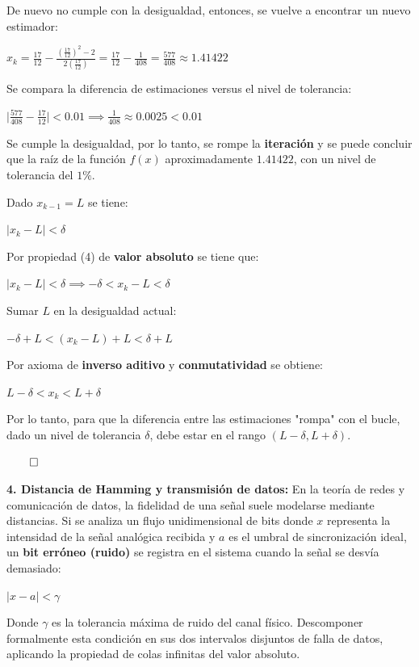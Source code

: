 \documentclass{article}
\newenvironment{nota_computacional}
  {\begin{mdframed}[backgroundcolor=gray!10, linecolor=gray!40, roundcorner=5pt, skipabove=10pt, skipbelow=10pt]}
  {\end{mdframed}}
\begin{document}
\begin{nota_computacional}
De nuevo no cumple con la desigualdad, entonces, se vuelve a encontrar un nuevo estimador:

$\displaystyle x_k = \frac{17}{12} - \frac{(\frac{17}{12})^2 - 2}{2(\frac{17}{12})} = \frac{17}{12} - \frac{1}{408} = \frac{577}{408} \approx 1.41422$

Se compara la diferencia de estimaciones versus el nivel de tolerancia:

$\mid \frac{577}{408} - \frac{17}{12}\mid < 0.01 \implies \frac{1}{408} \approx 0.0025 < 0.01$

Se cumple la desigualdad, por lo tanto, se rompe la \textbf{iteración} y se puede concluir que la raíz de la función $f(x)$ aproximadamente $1.41422$, con un nivel de tolerancia del $1\%$.

\end{nota_computacional}

Dado $x_{k - 1} = L$ se tiene:

$\mid x_k - L \mid < \delta$

Por propiedad (4) de \textbf{valor absoluto} se tiene que:

$\mid x_k - L \mid < \delta \implies -\delta < x_k - L <  \delta$

Sumar $L$ en la desigualdad actual:

$-\delta + L < (x_k - L) + L <  \delta + L$

Por axioma de \textbf{inverso aditivo} y \textbf{conmutatividad} se obtiene:

$L -\delta < x_k < L + \delta$

Por lo tanto, para que la diferencia entre las estimaciones "rompa" con el bucle, dado un nivel de tolerancia $\delta$, debe estar en el rango $(L -\delta, L + \delta)$.

$\qed$

\textbf{4. Distancia de Hamming y transmisión de datos:} En la teoría de redes y comunicación de datos, la fidelidad de una señal suele modelarse  mediante distancias. Si se analiza un flujo unidimensional de bits donde $x$ representa la intensidad de la señal analógica recibida y $a$ es el umbral de sincronización ideal, un \textbf{bit erróneo (ruido)} se registra en el sistema cuando la señal se desvía demasiado:

$\mid x - a \mid < \gamma$

Donde $\gamma$ es la tolerancia máxima de ruido del canal físico. Descomponer formalmente esta condición en sus dos intervalos disjuntos de falla de datos, aplicando la propiedad de colas infinitas del valor absoluto.
\end{document}
